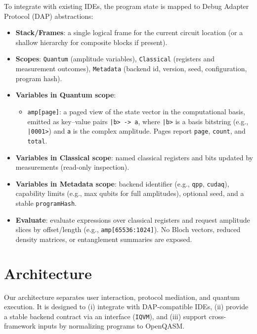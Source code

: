 \documentclass[12pt]{article}
\begin{document}
To integrate with existing IDEs, the program state is mapped to Debug Adapter Protocol (DAP) abstractions:

\begin{itemize}
  \item \textbf{Stack/Frames}: a single logical frame for the current circuit location (or a shallow hierarchy for composite blocks if present).
  \item \textbf{Scopes}: \texttt{Quantum} (amplitude variables), \texttt{Classical} (registers and measurement outcomes), \texttt{Metadata} (backend id, version, seed, configuration, program hash).
  \item \textbf{Variables in Quantum scope}:
    \begin{itemize}
      \item \texttt{amp[page]}: a paged view of the state vector in the computational basis, emitted as key--value pairs \texttt{|b> -> a}, where \texttt{|b>} is a basis bitstring (e.g., \texttt{|0001>}) and \texttt{a} is the complex amplitude. Pages report \texttt{page}, \texttt{count}, and \texttt{total}.
    \end{itemize}
  \item \textbf{Variables in Classical scope}: named classical registers and bits updated by measurements (read-only inspection).
  \item \textbf{Variables in Metadata scope}: backend identifier (e.g., \texttt{qpp}, \texttt{cudaq}), capability limits (e.g., max qubits for full amplitudes), optional seed, and a stable \texttt{programHash}.
  \item \textbf{Evaluate}: evaluate expressions over classical registers and request amplitude slices by offset/length (e.g., \texttt{amp[65536:1024]}). No Bloch vectors, reduced density matrices, or entanglement summaries are exposed.
\end{itemize}



\section{Architecture}
\label{sec:architecture}

Our architecture separates user interaction, protocol mediation, and quantum execution. It is designed to (i) integrate with DAP-compatible IDEs, (ii) provide a stable backend contract via an interface (\texttt{IQVM}), and (iii) support cross-framework inputs by normalizing programs to OpenQASM.
\end{document}
